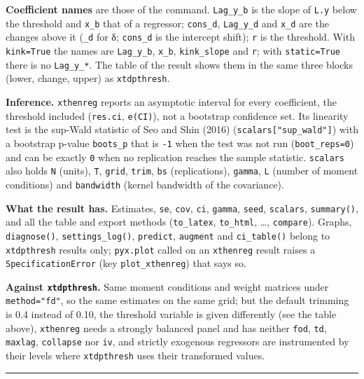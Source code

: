 \documentclass[
  10.5pt,
  a4paper,
]{article}
\begin{document}
\textbf{Coefficient names} are those of the command. \texttt{Lag\_y\_b}
is the slope of \texttt{L.y} below the threshold and \texttt{x\_b} that
of a regressor; \texttt{cons\_d}, \texttt{Lag\_y\_d} and \texttt{x\_d}
are the changes above it (\texttt{\_d} for δ; \texttt{cons\_d} is the
intercept shift); \texttt{r} is the threshold. With \texttt{kink=True}
the names are \texttt{Lag\_y\_b}, \texttt{x\_b}, \texttt{kink\_slope}
and \texttt{r}; with \texttt{static=True} there is no
\texttt{Lag\_y\_*}. The table of the result shows them in the same three
blocks (lower, change, upper) as \texttt{xtdpthresh}.

\textbf{Inference.} \texttt{xthenreg} reports an asymptotic interval for
every coefficient, the threshold included (\texttt{res.ci},
\texttt{e(CI)}), not a bootstrap confidence set. Its linearity test is
the sup-Wald statistic of Seo and Shin (2016)
(\texttt{scalars{[}"sup\_wald"{]}}) with a bootstrap p-value
\texttt{boots\_p} that is \texttt{-1} when the test was not run
(\texttt{boot\_reps=0}) and can be exactly \texttt{0} when no
replication reaches the sample statistic. \texttt{scalars} also holds
\texttt{N} (units), \texttt{T}, \texttt{grid}, \texttt{trim},
\texttt{bs} (replications), \texttt{gamma}, \texttt{L} (number of moment
conditions) and \texttt{bandwidth} (kernel bandwidth of the covariance).

\textbf{What the result has.} Estimates, \texttt{se}, \texttt{cov},
\texttt{ci}, \texttt{gamma}, \texttt{seed}, \texttt{scalars},
\texttt{summary()}, and all the table and export methods
(\texttt{to\_latex}, \texttt{to\_html}, \ldots, \texttt{compare}).
Graphs, \texttt{diagnose()}, \texttt{settings\_log()}, \texttt{predict},
\texttt{augment} and \texttt{ci\_table()} belong to \texttt{xtdpthresh}
results only; \texttt{pyx.plot} called on an \texttt{xthenreg} result
raises a \texttt{SpecificationError} (key \texttt{plot\_xthenreg}) that
says so.

\textbf{Against \texttt{xtdpthresh}.} Same moment conditions and weight
matrices under \texttt{method="fd"}, so the same estimates on the same
grid; but the default trimming is 0.4 instead of 0.10, the threshold
variable is given differently (see the table above), \texttt{xthenreg}
needs a strongly balanced panel and has neither \texttt{fod},
\texttt{td}, \texttt{maxlag}, \texttt{collapse} nor \texttt{iv}, and
strictly exogenous regressors are instrumented by their levels where
\texttt{xtdpthresh} uses their transformed values.

\begin{center}\rule{0.5\linewidth}{0.5pt}\end{center}
\end{document}
